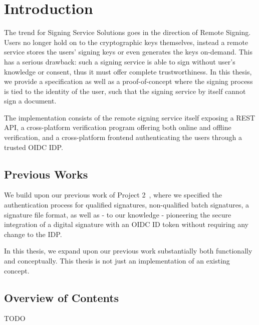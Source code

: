 \chapter{Introduction}
\label{ch:Introduction}

The trend for Signing Service Solutions goes in the direction of Remote Signing.
Users no longer hold on to the cryptographic keys themselves,
instead a remote service stores the users' signing keys or even generates the keys on-demand.
This has a serious drawback:
such a signing service is able to sign without user's knowledge or consent,
thus it must offer complete trustworthiness.
In this thesis,
we provide a specification as well as a proof-of-concept where the signing process is tied to the identity of the user,
such that the signing service by itself cannot sign a document.

The implementation consists of the remote signing service itself exposing a \gls{REST} \gls{API},
a cross-platform verification program offering both online and offline verification,
and a cross-platform frontend authenticating the users through a trusted \gls{OIDC} \gls{IDP}.


\section{Previous Works}
\label{sec:previousworks}

We build upon our previous work of Project 2~\cite{projekt2},
where we specified the authentication process for qualified signatures,
non-qualified batch signatures,
a signature file format,
as well as - to our knowledge - pioneering the secure integration of a digital signature with an \gls{OIDC} ID token without requiring any change to the \gls{IDP}.

In this thesis, we expand upon our previous work substantially both functionally and conceptually.
This thesis is not just an implementation of an existing concept.

\section{Overview of Contents}\label{sec:overview}
TODO

